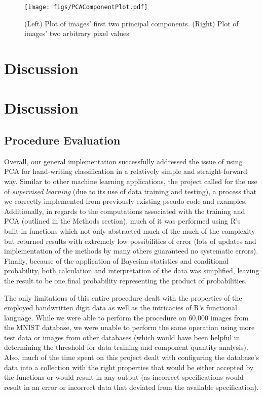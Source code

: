 \documentclass[twocolumn]{article}
\begin{document}
\begin{figure}
    \centering
    \texttt{[image: figs/PCAComponentPlot.pdf]}
    \caption{(Left) Plot of images' first two principal components. (Right) Plot of images' two arbitrary pixel values}
    \label{fig:pcaplot}
\end{figure}    

\section{Discussion} %
\label{sec:discussion}
\cite{bayes}

\section{Discussion}

\subsection{Procedure Evaluation}
\label{subsec:eval}

Overall, our general implementation successfully addressed the issue of using PCA for hand-writing classification in a relatively simple and straight-forward way. Similar to other machine learning applications, the project called for the use of  \emph{supervised learning} (due to its use of data training and testing), a process that we correctly implemented from previously existing pseudo code and examples. Additionally, in regards to the computations associated with the training and PCA (outlined in the Methods section), much of it was performed using R's built-in functions which not only abstracted much of the much of the complexity but returned results with extremely low possibilities of error (lots of updates and implementation of the methods by many others guaranteed no systematic errors). Finally, because of the application of Bayesian statistics and conditional probability, both calculation and interpretation of the data was simplified, leaving the result to be one final probability representing the product of probabilities. 

The only limitations of this entire procedure dealt with the properties of the employed handwritten digit data as well as the intricacies of R's functional language. While we were able to perform the procedure on 60,000 images from the MNIST database, we were unable to perform the same operation using more test data or images from other databases (which would have been helpful in determining the threshold for data training and component quantity analysis). Also, much of the time spent on this project dealt with configuring the database's data into a collection with the right properties that would be either accepted by the functions or would result in any output (as incorrect specifications would result in an error or incorrect data that deviated from the available specification).
\end{document}
